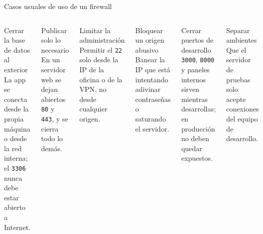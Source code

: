 \documentclass[aspectratio=169,10pt,c]{beamer}
\begin{document}
\begin{frame}{Casos usuales de uso de un firewall}
\begin{columns}[T,onlytextwidth]
\begin{exampleblock}{Cerrar la base de datos al exterior}
\small La app se conecta desde la propia máquina o desde la red interna; el \texttt{3306} nunca debe estar abierto a Internet.
\end{exampleblock}
\begin{exampleblock}{Publicar solo lo necesario}
\small En un servidor web se dejan abiertos \texttt{80} y \texttt{443}, y se cierra todo lo demás.
\end{exampleblock}
\begin{exampleblock}{Limitar la administración}
\small Permitir el \texttt{22} solo desde la IP de la oficina o de la VPN, no desde cualquier origen.
\end{exampleblock}
\begin{exampleblock}{Bloquear un origen abusivo}
\small Banear la IP que está intentando adivinar contraseñas o saturando el servidor.
\end{exampleblock}
\begin{exampleblock}{Cerrar puertos de desarrollo}
\small \texttt{3000}, \texttt{8000} y paneles internos sirven mientras desarrollas; en producción no deben quedar expuestos.
\end{exampleblock}
\begin{exampleblock}{Separar ambientes}
\small Que el servidor de pruebas solo acepte conexiones del equipo de desarrollo.
\end{exampleblock}
\end{columns}
\end{frame}
\end{document}
